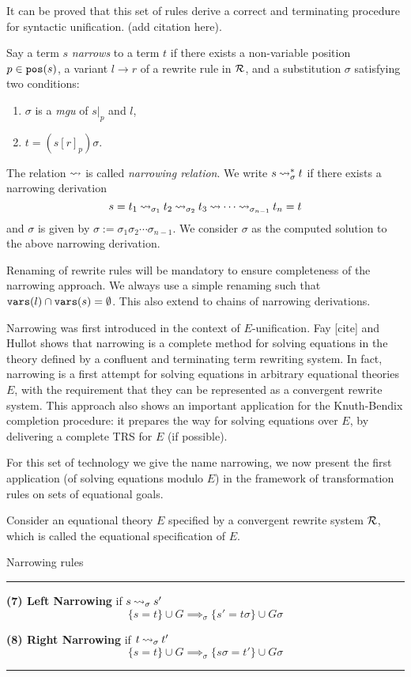 It can be proved that this set of rules derive a correct and terminating procedure for syntactic unification. (add citation here).

\begin{definition}\label{definition:narrow}
	Say a term $s$ \textit{narrows} to a term $t$ if there exists a non-variable position $p \in \mathtt{pos}(s)$, a variant $l \rightarrow r$ of a rewrite rule in $\mathcal{R}$, and a substitution $\sigma$ satisfying two conditions:
	\begin{enumerate}
		\item $\sigma$ is a \textit{mgu} of $s|_p$ and $l$,
		\item $t = \left( s[r]_{p} \right)\sigma$.
	\end{enumerate}
\end{definition}

The relation $\mathbin{\rightsquigarrow}$ is called \textit{narrowing relation}. We write $s \mathbin{\rightsquigarrow}_{\sigma}^{*} t$ if there exists a narrowing derivation
$$s = t_1 \mathbin{\rightsquigarrow}_{\sigma_1} t_2 \mathbin{\rightsquigarrow}_{\sigma_2} t_3 \mathbin{\rightsquigarrow} \cdots \mathbin{\rightsquigarrow}_{\sigma_{n-1}}t_n = t$$
and $\sigma$ is given by $\sigma := \sigma_1\sigma_2 \cdots \sigma_{n-1}$. We consider $\sigma$ as the computed solution to the above narrowing derivation.

\begin{remark}
	Renaming of rewrite rules will be mandatory to ensure completeness of the narrowing approach. We always use a simple renaming such that $\mathtt{vars}(l) \cap \mathtt{vars}(s) = \emptyset$. This also extend to chains of narrowing derivations.
\end{remark}

Narrowing was first introduced in the context of $E$-unification. Fay [cite] and Hullot \cite{hullot:cfunif} shows that narrowing is a complete method for solving equations in the theory defined by a confluent and terminating term rewriting system. In fact, narrowing is a first attempt for solving equations in arbitrary equational theories $E$, with the requirement that they can be represented as a convergent rewrite system. This approach also shows an important application for the Knuth-Bendix completion procedure: it prepares the way for solving equations over $E$, by delivering a complete TRS for $E$ (if possible).

For this set of technology we give the name narrowing, we now present the first application (of solving equations modulo $E$) in the framework of transformation rules on sets of equational goals.

Consider an equational theory $E$ specified by a convergent rewrite system $\mathcal{R}$, which is called the equational specification of $E$. \newpage
\begin{table}[ht]
	\caption{Narrowing rules}
	\label{table:narrowing_inf_rules}
	{\small
		\hrule
		\vspace{10pt}

		\textbf{(7) Left Narrowing} if $s \mathbin{\rightsquigarrow}_{\sigma} s'$
		$$\{ s = t \} \cup G \implies_{\sigma} \{ s' = t\sigma \} \cup G\sigma $$

		\textbf{(8) Right Narrowing} if $t \mathbin{\rightsquigarrow}_{\sigma} t'$
		$$\{ s = t \} \cup G \implies_{\sigma} \{ s\sigma = t' \} \cup G\sigma $$
		\hrule
	}
\end{table}

